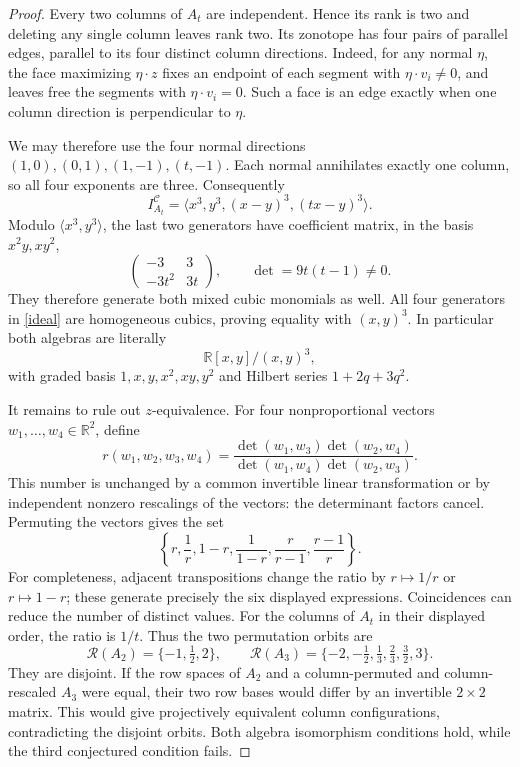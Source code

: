\documentclass[11pt]{article}
\newcommand{\R}{\mathbb R}
\begin{document}
\begin{proof}
Every two columns of $A_t$ are independent. Hence its rank is two and
deleting any single column leaves rank two. Its zonotope has four pairs
of parallel edges, parallel to its four distinct column directions.
Indeed, for any normal $\eta$, the face maximizing $\eta\cdot z$ fixes an
endpoint of each segment with $\eta\cdot v_i\ne0$, and leaves free the
segments with $\eta\cdot v_i=0$. Such a face is an edge exactly when one
column direction is perpendicular to $\eta$.

We may therefore use the four normal directions
$(1,0),(0,1),(1,-1),(t,-1)$. Each normal annihilates exactly one column,
so all four exponents are three. Consequently
\begin{equation}\label{ideal}
 I_{A_t}^{\mathcal C}
 =\langle x^3,y^3,(x-y)^3,(tx-y)^3\rangle.
\end{equation}
Modulo $\langle x^3,y^3\rangle$, the last two generators have coefficient
matrix, in the basis $x^2y,xy^2$,
\[
 \begin{pmatrix}-3&3\\-3t^2&3t\end{pmatrix},
 \qquad\det=9t(t-1)\ne0.
\]
They therefore generate both mixed cubic monomials as well. All four
generators in \eqref{ideal} are homogeneous cubics, proving equality with
$(x,y)^3$. In particular both algebras are literally
\[
 \R[x,y]/(x,y)^3,
\]
with graded basis $1,x,y,x^2,xy,y^2$ and Hilbert series $1+2q+3q^2$.

It remains to rule out $z$-equivalence. For four nonproportional vectors
$w_1,\ldots,w_4\in\R^2$, define
\[
 r(w_1,w_2,w_3,w_4)
 =\frac{\det(w_1,w_3)\det(w_2,w_4)}
 {\det(w_1,w_4)\det(w_2,w_3)}.
\]
This number is unchanged by a common invertible linear transformation or
by independent nonzero rescalings of the vectors: the determinant factors
cancel. Permuting the vectors gives the set
\begin{equation}\label{orbit}
 \left\{r,\frac1r,1-r,\frac1{1-r},
 \frac r{r-1},\frac{r-1}r\right\}.
\end{equation}
For completeness, adjacent transpositions change the ratio by $r\mapsto
1/r$ or $r\mapsto1-r$; these generate precisely the six displayed
expressions. Coincidences can reduce the number of distinct values.
For the columns of $A_t$ in their displayed order, the ratio is $1/t$.
Thus the two permutation orbits are
\[
 \mathcal R(A_2)=\{-1,\tfrac12,2\},\qquad
 \mathcal R(A_3)=\{-2,-\tfrac12,\tfrac13,\tfrac23,\tfrac32,3\}.
\]
They are disjoint. If the row spaces of $A_2$ and a column-permuted and
column-rescaled $A_3$ were equal, their two row bases would differ by an
invertible $2\times2$ matrix. This would give projectively equivalent
column configurations, contradicting the disjoint orbits. Both algebra
isomorphism conditions hold, while the third conjectured condition fails.
\end{proof}
\end{document}
